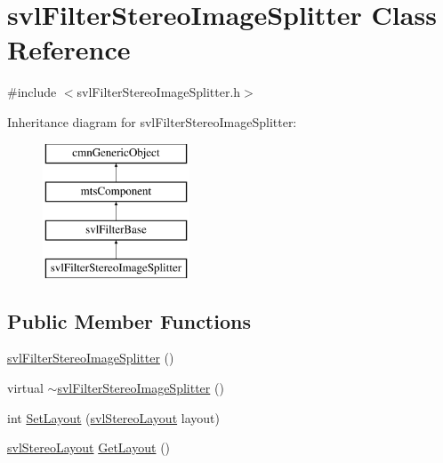 \hypertarget{classsvl_filter_stereo_image_splitter}{\section{svl\-Filter\-Stereo\-Image\-Splitter Class Reference}
\label{classsvl_filter_stereo_image_splitter}
}


{\ttfamily \#include $<$svl\-Filter\-Stereo\-Image\-Splitter.\-h$>$}

Inheritance diagram for svl\-Filter\-Stereo\-Image\-Splitter\-:\begin{figure}[H]
\begin{center}
\leavevmode
\includegraphics[height=4.000000cm]{dd/d18/classsvl_filter_stereo_image_splitter}
\end{center}
\end{figure}
\subsection*{Public Member Functions}
\begin{DoxyCompactItemize}
\item 
\hyperlink{classsvl_filter_stereo_image_splitter_af4c3b59e317fb02e778add754680756f}{svl\-Filter\-Stereo\-Image\-Splitter} ()
\item 
virtual \hyperlink{classsvl_filter_stereo_image_splitter_ac70ff51c7cd566aa8e303f0d22f7b004}{$\sim$svl\-Filter\-Stereo\-Image\-Splitter} ()
\item 
int \hyperlink{classsvl_filter_stereo_image_splitter_a55390c58a269f1578a1f85026de50f20}{Set\-Layout} (\hyperlink{svl_definitions_8h_aa90f34342a069f42a847f43f2abb812f}{svl\-Stereo\-Layout} layout)
\item 
\hyperlink{svl_definitions_8h_aa90f34342a069f42a847f43f2abb812f}{svl\-Stereo\-Layout} \hyperlink{classsvl_filter_stereo_image_splitter_ade4377378c9b33165c3d67515bde172f}{Get\-Layout} ()
\end{DoxyCompactItemize}
